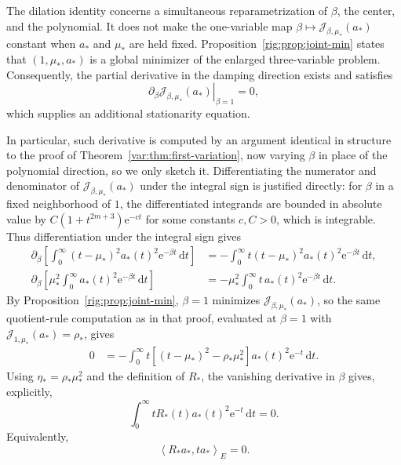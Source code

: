 \documentclass[11pt]{article}
\numberwithin{equation}{section}
\theoremstyle{definition}
\theoremstyle{remark}
\newcommand{\dd}{\,\mathrm d}
\newcommand{\e}{\mathrm e}
\newcommand{\ip}[2]{\left\langle #1,#2\right\rangle_{E}}
\begin{document}
The dilation identity concerns a simultaneous reparametrization of $\beta$,
the center, and the polynomial. It does not make the one-variable map $\beta{\mapsto}\mathcal J_{\beta,\mu_*}(a_*)$
constant when $a_*$ and $\mu_*$ are held fixed. Proposition~\ref{rig:prop:joint-min}
states that $(1,\mu_*,a_*)$ is a global minimizer of the enlarged
three-variable problem. Consequently, the partial derivative in the damping
direction exists and satisfies
\[
  \left.\partial_\beta\mathcal J_{\beta,\mu_*}(a_*)\right|_{\beta=1}=0,
\]
which supplies
an additional stationarity equation.

In particular, such derivative is computed by an argument identical in structure to the proof of Theorem~\ref{var:thm:first-variation}, now varying \(\beta\) in place of the polynomial direction, so we only sketch it. Differentiating the numerator and denominator of \(\mathcal J_{\beta,\mu_*}(a_*)\) under the integral sign is justified directly: for \(\beta\) in a fixed neighborhood of $1$, the differentiated integrands are bounded in absolute value by $C(1+t^{2m+3})\e^{-ct}$ for some constants $c,C>0$, which is integrable. Thus differentiation under the integral sign gives
\begin{align*}
    \partial_\beta\left[\int_0^\infty (t-\mu_*)^2a_*(t)^2\e^{-\beta t}\dd t\right]
    &=-\int_0^\infty t(t-\mu_*)^2a_*(t)^2\e^{-\beta t}\dd t,
      \\
    \partial_\beta\left[\mu_*^2\int_0^\infty a_*(t)^2\e^{-\beta t}\dd t\right]
    &=-\mu_*^2\int_0^\infty t\,a_*(t)^2\e^{-\beta t}\dd t.
\end{align*}
By Proposition~\ref{rig:prop:joint-min}, \(\beta=1\) minimizes \(\mathcal J_{\beta,\mu_*}(a_*)\), so the same quotient-rule computation as in that proof, evaluated at \(\beta=1\) with \(\mathcal J_{1,\mu_*}(a_*)=\rho_*\), gives
\begin{align*}
    0
    &=-\int_0^\infty
      t\left[(t-\mu_*)^2-\rho_*\mu_*^2\right]
      a_*(t)^2\e^{-t}\dd t.
\end{align*}
Using $\eta_*=\rho_*\mu_*^2$ and the definition of $R_*$, the vanishing derivative in $\beta$ gives, explicitly,
\begin{equation}\label{rig:eq:scale-stationarity}
    \int_0^\infty tR_*(t)a_*(t)^2\e^{-t}\dd t=0.
\end{equation}
Equivalently,
\begin{equation}\label{rig:eq:scale-inner-product}
    \ip{R_*a_*}{t a_*}=0.
\end{equation}
\end{document}
